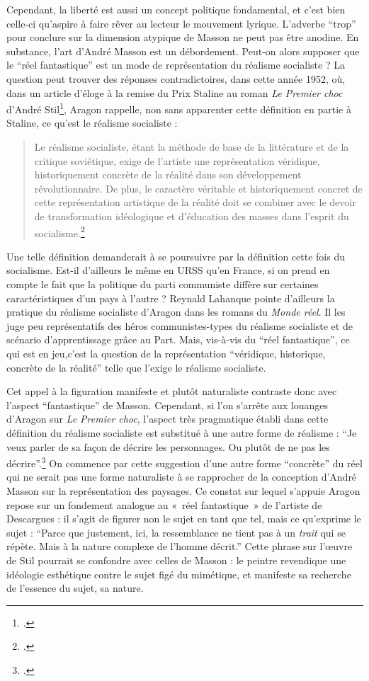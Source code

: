 	Cependant, la liberté est aussi un concept politique fondamental, et c’est bien celle-ci qu’aspire à faire rêver au lecteur le mouvement lyrique. L’adverbe \enquote{trop} pour conclure sur la dimension atypique de Masson ne peut pas être anodine. En substance, l’art d’André Masson est un débordement. Peut-on alors supposer que le \enquote{réel fantastique} est un mode de représentation du réalisme socialiste ? La question peut trouver des réponses contradictoires, dans cette année 1952, où, dans un article d’éloge à la remise du Prix Staline au roman \emph{Le Premier choc} d'André Stil\footcite{prixstaline}, Aragon rappelle, non sans apparenter cette définition en partie à Staline, ce qu’est le réalisme socialiste : 
	\begin{quote}
	Le réalisme socialiste, étant la méthode de base de la littérature et de la critique soviétique, exige de l’artiste une représentation véridique, historiquement concrète de la réalité dans son développement révolutionnaire. De plus, le caractère véritable et historiquement concret de cette représentation artistique de la réalité doit se combiner avec le devoir de transformation idéologique et d’éducation des masses dans l’esprit du socialisme.\footcite{prixstaline}\end{quote}
	
	 Une telle définition demanderait à se poursuivre par la définition cette fois du socialisme. Est-il d’ailleurs le même en URSS qu’en France, si on prend en compte le fait que la politique du parti communiste diffère sur certaines caractéristiques d’un pays à l’autre ? Reynald Lahanque pointe d’ailleurs la pratique du réalisme socialiste d’Aragon dans les romans du \emph{Monde réel}. Il les juge peu représentatifs des héros communistes-types du réalisme socialiste et de scénario d’apprentissage grâce au Part. Mais, vis-à-vis du \enquote{réel fantastique}, ce qui est en jeu,c’est la question de la représentation \enquote{véridique, historique, concrète de la réalité} telle que l'exige le réalisme socialiste. 

 Cet appel à la figuration manifeste et plutôt naturaliste contraste donc avec l’aspect \enquote{fantastique} de Masson. Cependant, si l’on s’arrête aux louanges d’Aragon sur \emph{Le Premier choc}, l’aspect très pragmatique établi dans cette définition du réalisme socialiste est substitué à une autre forme de réalisme : \enquote{Je veux parler de sa façon de décrire les personnages. Ou plutôt de ne pas les décrire}.\footcite{prixstaline} On commence par cette suggestion d’une autre forme \enquote{concrète} du réel qui ne serait pas une forme naturaliste à se rapprocher de la conception d’André Masson sur la représentation des paysages. Ce constat sur lequel s’appuie Aragon repose sur un fondement analogue au « réel fantastique » de l’artiste de Descargues : il s'agit de figurer non le sujet en tant que tel, mais ce qu’exprime le sujet : \enquote{Parce que justement, ici, la ressemblance ne tient  pas à un \emph{trait} qui se répète. Mais à la nature complexe de l’homme décrit.} Cette phrase sur l’\oe{}uvre de Stil pourrait se confondre avec celles de Masson : le peintre revendique une idéologie esthétique contre le sujet figé du mimétique, et manifeste sa recherche de l’essence du sujet, sa nature. 


